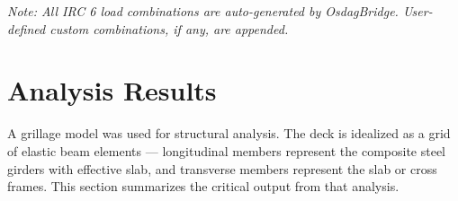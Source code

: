 \documentclass[12pt,a4paper]{report}
\numberwithin{table}{chapter}
\numberwithin{figure}{chapter}
\renewcommand{\arraystretch}{1.12}
\begin{document}
\noindent\textit{Note: All IRC 6 load combinations are auto-generated by OsdagBridge. User-defined custom combinations, if any, are appended.}


\chapter{Analysis Results}

A grillage model was used for structural analysis. The deck is idealized as a grid of elastic beam elements --- longitudinal members represent the composite steel girders with effective slab, and transverse members represent the slab or cross frames. This section summarizes the critical output from that analysis.

\vspace{1em}
\begingroup
\footnotesize
\setlength{\tabcolsep}{2pt}
\renewcommand{\arraystretch}{1.12}
\end{document}
